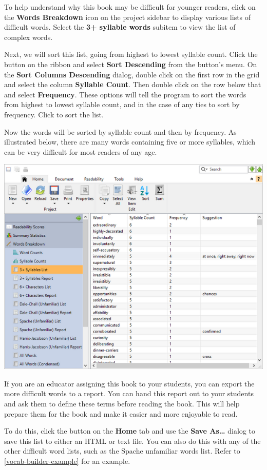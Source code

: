 \documentclass[
]{book}
\theoremstyle{definition}
\theoremstyle{definition}
\theoremstyle{definition}
\theoremstyle{definition}
\theoremstyle{remark}
\begin{document}
To help understand why this book may be difficult for younger readers, click on the \textbf{Words Breakdown} icon on the project sidebar to display various lists of difficult words. Select the \textbf{3+ syllable words} subitem to view the list of complex words.

Next, we will sort this list, going from highest to lowest syllable count. Click the  button on the ribbon and select \textbf{Sort Descending} from the button's menu. On the \textbf{Sort Columns Descending} dialog, double click on the first row in the grid and select the column \textbf{Syllable Count}. Then double click on the row below that and select \textbf{Frequency}. These options will tell the program to sort the words from highest to lowest syllable count, and in the case of any ties to sort by frequency. Click  to sort the list.

Now the words will be sorted by syllable count and then by frequency. As illustrated below, there are many words containing five or more syllables, which can be very difficult for most readers of any age.

\includegraphics{Images/difficultwords.png}

If you are an educator assigning this book to your students, you can export the more difficult words to a report. You can hand this report out to your students and ask them to define these terms before reading the book. This will help prepare them for the book and make it easier and more enjoyable to read.

To do this, click the  button on the \textbf{Home} tab and use the \textbf{Save As\ldots{}} dialog to save this list to either an HTML or text file. You can also do this with any of the other difficult word lists, such as the Spache unfamiliar words list. Refer to \ref{vocab-builder-example} for an example.
\end{document}
